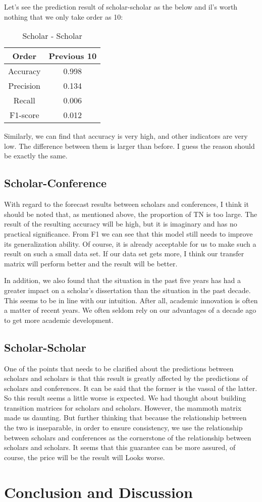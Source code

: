 \documentclass[conference]{IEEEtran}
\begin{document}
Let's see the prediction result of scholar-scholar as the below and il's worth nothing that we only take order as 10:
 \renewcommand\arraystretch{1.5}
\begin{table}[htbp]
		\centering
		\begin{tabular}{c|c}
			\hline \hline
			 Order & Previous 10 \\ 
			\hline 
			Accuracy  & 0.998 \\

			Precision & 0.134 \\ 

			Recall    &   0.006\\ 
			
			F1-score  &    0.012 \\\hline
		\end{tabular} 
		\caption{Scholar - Scholar}
\end{table}
Similarly, we can find that accuracy is very high, and other indicators are very low. The difference between them is larger than before. I guess the reason should be exactly the same.
\subsection{Scholar-Conference}
With regard to the forecast results between scholars and conferences, I think it should be noted that, as mentioned above, the proportion of TN is too large. The result of the resulting accuracy will be high, but it is imaginary and has no practical significance. From F1 we can see that this model still needs to improve its generalization ability. Of course, it is already acceptable for us to make such a result on such a small data set. If our data set gets more, I think our transfer matrix will perform better and the result will be better.

In addition, we also found that the situation in the past five years has had a greater impact on a scholar's dissertation than the situation in the past decade. This seems to be in line with our intuition. After all, academic innovation is often a matter of recent years. We often seldom rely on our advantages of a decade ago to get more academic development.
\subsection{Scholar-Scholar}
One of the points that needs to be clarified about the predictions between scholars and scholars is that this result is greatly affected by the predictions of scholars and conferences. It can be said that the former is the vassal of the latter. So this result seems a little worse is expected. We had thought about building transition matrices for scholars and scholars. However, the mammoth matrix made us daunting. But further thinking that because the relationship between the two is inseparable, in order to ensure consistency, we use the relationship between scholars and conferences as the cornerstone of the relationship between scholars and scholars. It seems that this guarantee can be more assured, of course, the price will be the result will Looks worse.
\section{Conclusion and Discussion}


\end{document}
